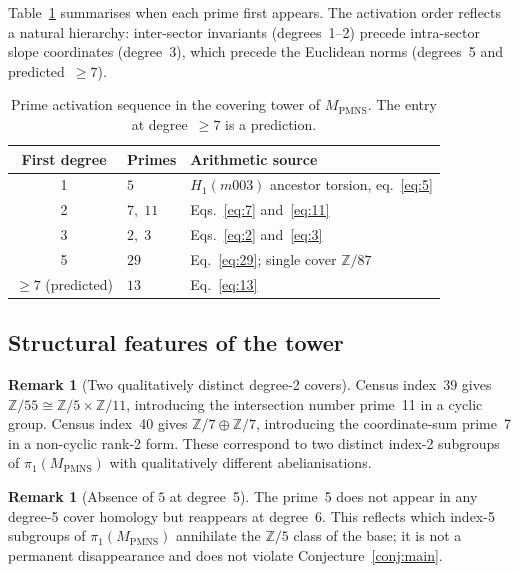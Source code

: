 \documentclass[12pt]{article}
\theoremstyle{definition}
\newtheorem{remark}[theorem]{Remark}
\begin{document}
Table~\ref{tab:activation} summarises when each prime first appears.
The activation order reflects a natural hierarchy: inter-sector invariants
(degrees~1--2) precede intra-sector slope coordinates (degree~3), which
precede the Euclidean norms (degrees~5 and predicted~$\geq 7$).

\begin{table}[htbp]
\centering
\caption{Prime activation sequence in the covering tower of
  $M_{\mathrm{PMNS}}$. The entry at degree~$\geq 7$ is a prediction.}
\label{tab:activation}
\begin{tabular}{cll}
\toprule
First degree & Primes & Arithmetic source \\
\midrule
1 & $5$      & $H_1(m003)$ ancestor torsion, eq.~\eqref{eq:5} \\
2 & $7,\;11$ & Eqs.~\eqref{eq:7} and~\eqref{eq:11} \\
3 & $2,\;3$  & Eqs.~\eqref{eq:2} and~\eqref{eq:3} \\
5 & $29$     & Eq.~\eqref{eq:29}; single cover $\mathbb{Z}/87$ \\
$\geq 7$ (predicted) & $13$ & Eq.~\eqref{eq:13} \\
\bottomrule
\end{tabular}
\end{table}

\subsection{Structural features of the tower}

\begin{remark}[Two qualitatively distinct degree-2 covers]
Census index~39 gives $\mathbb{Z}/55 \cong \mathbb{Z}/5 \times
\mathbb{Z}/11$, introducing the intersection number prime~11 in a cyclic
group. Census index~40 gives $\mathbb{Z}/7 \oplus \mathbb{Z}/7$,
introducing the coordinate-sum prime~7 in a non-cyclic rank-2 form.
These correspond to two distinct index-2 subgroups of
$\pi_1(M_{\mathrm{PMNS}})$ with qualitatively different abelianisations.
\end{remark}

\begin{remark}[Absence of $5$ at degree~5]
The prime~5 does not appear in any degree-5 cover homology but reappears
at degree~6. This reflects which index-5 subgroups of
$\pi_1(M_{\mathrm{PMNS}})$ annihilate the $\mathbb{Z}/5$ class of the
base; it is not a permanent disappearance and does not violate
Conjecture~\ref{conj:main}.
\end{remark}
\end{document}
